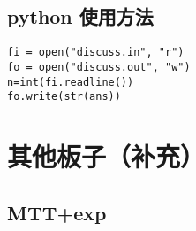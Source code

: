 \documentclass[12pt]{ctexart}
\begin{document}
\subsection{python 使用方法}

\begin{lstlisting}
fi = open("discuss.in", "r")
fo = open("discuss.out", "w")
n=int(fi.readline())
fo.write(str(ans))
\end{lstlisting}

\newpage

\section{其他板子（补充）}

\subsection{MTT+exp}
\end{document}
